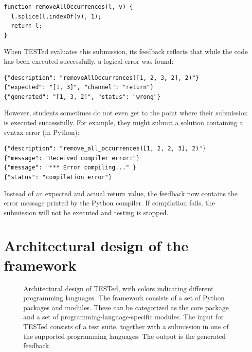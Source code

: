\documentclass[../main]{subfiles}
\begin{document}
\begin{verbatim}
function removeAllOccurrences(l, v) {
  l.splice(l.indexOf(v), 1);
  return l;
}
\end{verbatim}

When TESTed evaluates this submission, its feedback reflects that while the code has been executed successfully, a logical error was found:

\begin{verbatim}
{"description": "removeAllOccurrences([1, 2, 3, 2], 2)"}
{"expected": "[1, 3]", "channel": "return"}
{"generated": "[1, 3, 2]", "status": "wrong"}
\end{verbatim}

However, students sometimes do not even get to the point where their submission is executed successfully.
For example, they might submit a solution containing a syntax error (in Python):

\begin{verbatim}
{"description": "remove_all_occurrences([1, 2, 2, 3], 2)"}
{"message": "Received compiler error:"}
{"message": "*** Error compiling..." }
{"status": "compilation error"}
\end{verbatim}

Instead of an expected and actual return value, the feedback now contains the error message printed by the Python compiler.
If compilation fails, the submission will not be executed and testing is stopped.

\section{Architectural design of the framework}\label{sec:tested1-architectural-design}

\begin{figure}[t]
    \centering
    
    \caption{
        Architectural design of TESTed, with colors indicating different programming languages.
        The framework consists of a set of Python packages and modules.
        These can be categorized as the core package and a set of programming-language-specific modules.
        The input for TESTed consists of a test suite, together with a submission in one of the supported programming languages.
        The output is the generated feedback.
    }
    \label{fig:conceptual-design}
\end{figure}
\end{document}
